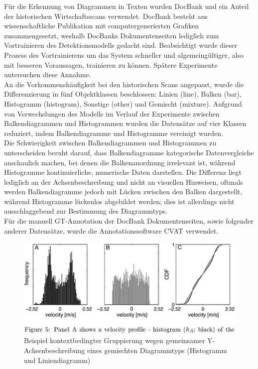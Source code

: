 Für die Erkennung von Diagrammen in Texten wurden DocBank \cite{li2020docbank} und ein Anteil der historischen Wirtschaftsscans verwendet. DocBank besteht aus wissenschaftliche Publikation mit computergenerierten Grafiken zusammengesetzt, weshalb DocBanks Dokumentenseiten lediglich zum Vortrainieren des Detektionsmodells gedacht sind. Beabsichtigt wurde dieser Prozess des Vortrainierens um das System schneller und algemeingültiger, also mit besseren Voraussagen, trainieren zu können. Spätere Experimente untersuchen diese Annahme.
\\
An die Vorkommenshäufigkeit bei den historischen Scans angepasst, wurde die Differenzierung in fünf Objektklassen beschlossen: Linien (line), Balken (bar), Histogramm (histogram), Sonstige (other) und Gemischt (mixture). Aufgrund von Verwechslungen des Modells im Verlauf der Experimente zwischen Balkendiagrammen und Histogrammen wurden die Datensätze auf vier Klassen reduziert, indem Balkendiagramme und Histogramme vereinigt wurden.
\\
Die Schwierigkeit zwischen Balkendiagrammen und Histogrammen zu unterscheiden beruht darauf, dass Balkendiagramme kategorische Datenvergleiche anschaulich machen, bei denen die Balkenanordnung irrelevant ist, während Histogramme kontinuierliche, numerische Daten darstellen. Die Differenz liegt lediglich an der Achsenbeschreibung und nicht an visuellen Hinweisen, oftmals werden Balkendiagramme jedoch mit Lücken zwischen den Balken dargestellt, während Histogramme lückenlos abgebildet werden; dies ist allerdings nicht ausschlaggebend zur Bestimmung des Diagrammtyps.
\\
Für die manuell GT-Annotation der DocBank Dokumentenseiten, sowie folgender anderer Datensätze, wurde die Annotationssoftware CVAT \cite{CVAT_ai_Corporation_Computer_Vision_Annotation_2023} verwendet.

\begin{figure}[H]
    \centering
    \captionsetup{width=.75\linewidth}
    \includegraphics[width=.75\textwidth]{Methodik/img/docbank_example.png}
    \caption{ Beispiel kontextbedingter Gruppierung wegen gemeinsamer Y-Achsenbeschreibung eines gemischten Diagrammtyps (Histogramm und Liniendiagramm)}
    \label{fig:docbank_example}
\end{figure}

